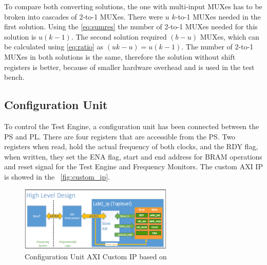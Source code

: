 To compare both converting solutions, the one with multi-input MUXes has to be broken into cascades of 2-to-1 MUXes. There were $u$ $k$-to-1 MUXes needed in the first solution. Using the \autoref{eq:sumres} the number of 2-to-1 MUXes needed for this solution is $u(k-1)$. The second solution required $(b-u)$ MUXes, which can be calculated using \autoref{eq:ratio} as $(uk-u)=u(k-1)$. The number of 2-to-1 MUXes in both solutions is the same, therefore the solution without shift registers is better, because of smaller hardware overhead and is used in the test bench.
\subsection{Configuration Unit}
To control the Test Engine, a configuration unit has been connected between the PS and PL. There are four registers that are accessible from the PS. Two registers when read, hold the actual frequency of both clocks, and the RDY flag, when written, they set the ENA flag, start and end address for BRAM operations and reset signal for the Test Engine and Frequency Monitors. The custom AXI IP is showed in the ~\autoref{fig:custom_ip}.

\begin{figure}[h]
\centering
\includegraphics[width=0.65\textwidth]{figures/Custom_ip.png}
\caption{Configuration Unit AXI Custom IP based on~\cite{report:custom_ip}}
\label{fig:custom_ip}
\end{figure}

